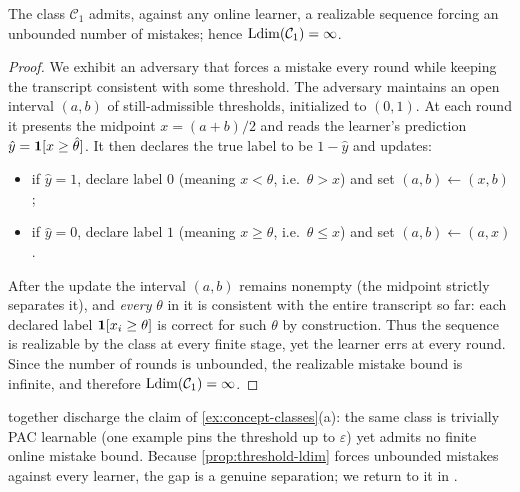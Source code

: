 \begin{prop}
\label{prop:threshold-ldim}
The class $\mathcal{C}_1$ admits, against any online learner, a realizable sequence forcing an unbounded number of mistakes; hence $\mathrm{Ldim}(\mathcal{C}_1) = \infty$.
\end{prop}

\begin{proof}
We exhibit an adversary that forces a mistake every round while keeping the transcript consistent with some threshold. The adversary maintains an open interval $(a,b)$ of still-admissible thresholds, initialized to $(0,1)$. At each round it presents the midpoint $x = (a+b)/2$ and reads the learner's prediction $\hat{y} = \mathbf{1}[x \geq \hat\theta]$. It then declares the true label to be $1 - \hat{y}$ and updates:
\begin{itemize}[nosep]
\item if $\hat{y} = 1$, declare label $0$ (meaning $x < \theta$, i.e.\ $\theta > x$) and set $(a,b) \leftarrow (x, b)$;
\item if $\hat{y} = 0$, declare label $1$ (meaning $x \geq \theta$, i.e.\ $\theta \leq x$) and set $(a,b) \leftarrow (a, x)$.
\end{itemize}
After the update the interval $(a,b)$ remains nonempty (the midpoint strictly separates it), and \emph{every} $\theta$ in it is consistent with the entire transcript so far: each declared label $\mathbf{1}[x_i \geq \theta]$ is correct for such $\theta$ by construction. Thus the sequence is realizable by the class at every finite stage, yet the learner errs at every round. Since the number of rounds is unbounded, the realizable mistake bound is infinite, and therefore $\mathrm{Ldim}(\mathcal{C}_1) = \infty$.
\end{proof}

 together discharge the claim of \cref{ex:concept-classes}(a): the same class is trivially PAC learnable (one example pins the threshold up to $\varepsilon$) yet admits no finite online mistake bound. Because \cref{prop:threshold-ldim} forces unbounded mistakes against every learner, the gap is a genuine separation; we return to it in .


